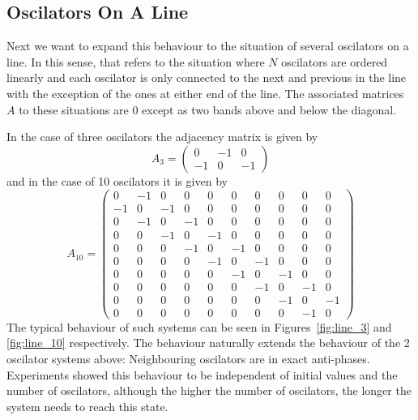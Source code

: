 \subsection{Oscilators On A Line}

Next we want to expand this behaviour to the situation of several oscilators on a line. In this sense, that refers to the situation where $N$ oscilators are ordered linearly and each oscilator is only connected to the next and previous in the line with the exception of the ones at either end of the line. The associated matrices $A$ to these situations are $0$ except as two bands above and below the diagonal.  

In the case of three oscilators the adjacency matrix is given by
\[
  A_3 = \left( \begin{array}{ccc}
  0  & -1 &  0\\ 
  -1 &  0 & -1
  \end{array} \right)
\] 
and in the case of 10 oscilators it is given by
\[
  A_{10} = \left( \begin{array}{cccccccccc}
  0 & -1 & 0 & 0 & 0 & 0 & 0 & 0 & 0 & 0 \\
  -1 & 0 & -1 & 0 & 0 & 0 & 0 & 0 & 0 & 0 \\
  0 & -1 & 0 & -1 & 0 & 0 & 0 & 0 & 0 & 0 \\
  0 & 0 & -1 & 0 & -1 & 0 & 0 & 0 & 0 & 0 \\
  0 & 0 & 0 & -1 & 0 & -1 & 0 & 0 & 0 & 0 \\
  0 & 0 & 0 & 0 & -1 & 0 & -1 & 0 & 0 & 0 \\
  0 & 0 & 0 & 0 & 0 & -1 & 0 & -1 & 0 & 0 \\
  0 & 0 & 0 & 0 & 0 & 0 & -1 & 0 & -1 & 0 \\
  0 & 0 & 0 & 0 & 0 & 0 & 0 & -1 & 0 & -1 \\
  0 & 0 & 0 & 0 & 0 & 0 & 0 & 0 & -1 & 0
  \end{array} \right)
\]
The typical behaviour of such systems can be seen in Figures~\ref{fig:line_3} and \ref{fig:line_10} respectively. The behaviour naturally extends the behaviour of the 2 oscilator systems above: Neighbouring oscilators are in exact anti-phases. Experiments showed this behaviour to be independent of initial values and the number of oscilators, although the higher the number of oscilators, the longer the system needs to reach this state. 

